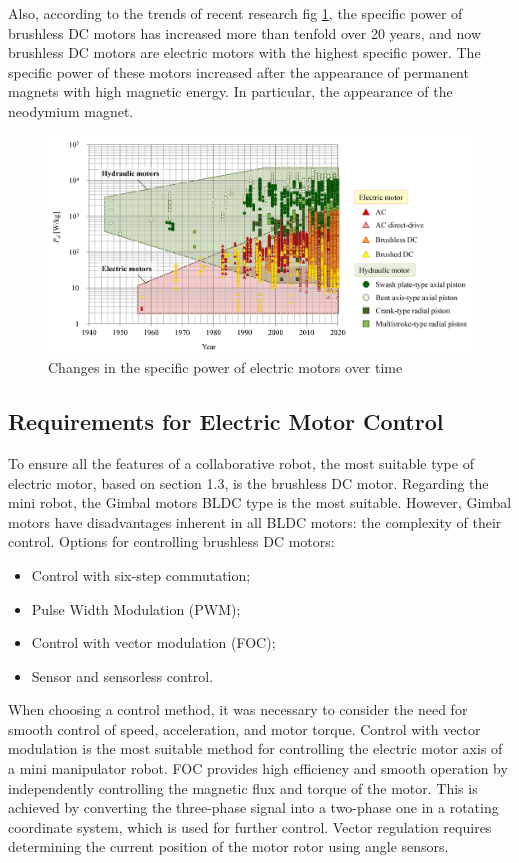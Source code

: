 Also, according to the trends of recent research \citep{Sakama2022} fig \ref{magnets}, the specific power of brushless DC motors has increased more than tenfold over 20 years, and now brushless DC motors are electric motors with the highest specific power. The specific power of these motors increased after the appearance of permanent magnets with high magnetic energy. In particular, the appearance of the neodymium magnet.

\begin{figure}[H]
	\centering
	\includegraphics[width=\textwidth]{Src/images/magnets.png}
	\caption{Changes in the specific power of electric motors over time \citep{Sakama2022}}
	\label{magnets}
\end{figure}
\subsection{Requirements for Electric Motor Control}

To ensure all the features of a collaborative robot, the most suitable type of electric motor, based on section 1.3, is the brushless DC motor. Regarding the mini robot, the Gimbal motors BLDC type is the most suitable. However, Gimbal motors have disadvantages inherent in all BLDC motors: the complexity of their control.
Options for controlling brushless DC motors:
\begin{itemize}
	\item Control with six-step commutation;
	\item Pulse Width Modulation (PWM);
	\item Control with vector modulation (FOC);
	\item Sensor and sensorless control.
\end{itemize}

When choosing a control method, it was necessary to consider the need for smooth control of speed, acceleration, and motor torque.
Control with vector modulation is the most suitable method for controlling the electric motor axis of a mini manipulator robot. FOC provides high efficiency and smooth operation by independently controlling the magnetic flux and torque of the motor. This is achieved by converting the three-phase signal into a two-phase one in a rotating coordinate system, which is used for further control. Vector regulation requires determining the current position of the motor rotor using angle sensors.


